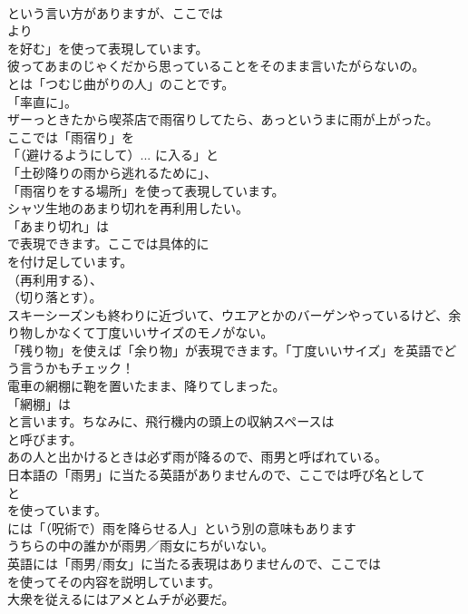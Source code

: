 \documentclass[8pt]{extreport}
\begin{document}
\begin{CJK}{UTF8}{min}
\\	という言い方がありますが、ここでは
\\	より
\\	を好む」を使って表現しています。	
\\	彼ってあまのじゃくだから思っていることをそのまま言いたがらないの。 
\\	とは「つむじ曲がりの人」のことです。
\\	「率直に」。	
\\	ザーっときたから喫茶店で雨宿りしてたら、あっというまに雨が上がった。 
\\	ここでは「雨宿り」を
\\	「（避けるようにして）... に入る」と
\\	「土砂降りの雨から逃れるために」、
\\	「雨宿りをする場所」を使って表現しています。	
\\	シャツ生地のあまり切れを再利用したい。 
\\	「あまり切れ」は
\\	で表現できます。ここでは具体的に
\\	を付け足しています。
\\	（再利用する）、
\\	（切り落とす）。	
\\	スキーシーズンも終わりに近づいて、ウエアとかのバーゲンやっているけど、余り物しかなくて丁度いいサイズのモノがない。 
\\	「残り物」を使えば「余り物」が表現できます。「丁度いいサイズ」を英語でどう言うかもチェック！	
\\	電車の網棚に鞄を置いたまま、降りてしまった。 
\\	「網棚」は
\\	と言います。ちなみに、飛行機内の頭上の収納スペースは
\\	と呼びます。	
\\	あの人と出かけるときは必ず雨が降るので、雨男と呼ばれている。 
\\	日本語の「雨男」に当たる英語がありませんので、ここでは呼び名として
\\	と
\\	を使っています。
\\	には「（呪術で）雨を降らせる人」という別の意味もあります	
\\	うちらの中の誰かが雨男／雨女にちがいない。 
\\	英語には「雨男/雨女」に当たる表現はありませんので、ここでは
\\	を使ってその内容を説明しています。	
\\	大衆を従えるにはアメとムチが必要だ。 

\end{CJK}
\end{document}
